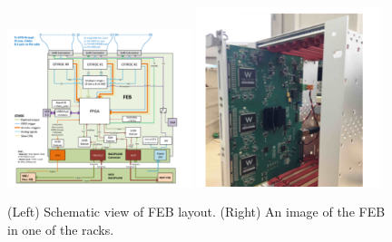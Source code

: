 


\begin{figure}[h!]
	\centering
\includegraphics[width=0.48\textwidth]{figures/FEB.png}
\includegraphics[width=0.48\textwidth]{figures/FEB2.png}
\caption{(Left) Schematic view of FEB layout. (Right) An image of the FEB in one of the racks.}
\label{fig:FEB}
\end{figure}

